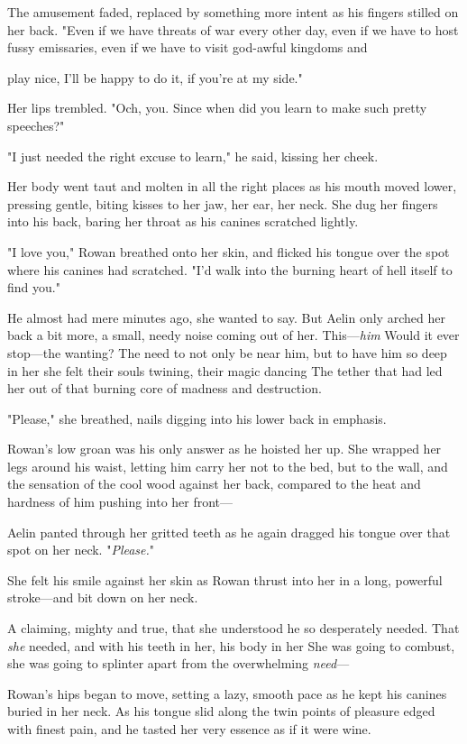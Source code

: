 The amusement faded, replaced by something more intent as his fingers stilled on her back. "Even if we have threats of war every other day, even if we have to host fussy emissaries, even if we have to visit god-awful kingdoms and

play nice, I'll be happy to do it, if you're at my side."

Her lips trembled. "Och, you. Since when did you learn to make such pretty speeches?"

"I just needed the right excuse to learn," he said, kissing her cheek.

Her body went taut and molten in all the right places as his mouth moved lower, pressing gentle, biting kisses to her jaw, her ear, her neck. She dug her fingers into his back, baring her throat as his canines scratched lightly.

"I love you," Rowan breathed onto her skin, and flicked his tongue over the spot where his canines had scratched. "I'd walk into the burning heart of hell itself to find you."

He almost had mere minutes ago, she wanted to say. But Aelin only arched her back a bit more, a small, needy noise coming out of her. This---\emph{him}  Would it ever stop---the wanting? The need to not only be near him, but to have him so deep in her she felt their souls twining, their magic dancing  The tether that had led her out of that burning core of madness and destruction.

"Please," she breathed, nails digging into his lower back in emphasis.

Rowan's low groan was his only answer as he hoisted her up. She wrapped her legs around his waist, letting him carry her not to the bed, but to the wall, and the sensation of the cool wood against her back, compared to the heat and hardness of him pushing into her front---

Aelin panted through her gritted teeth as he again dragged his tongue over that spot on her neck. "\emph{Please.}"

She felt his smile against her skin as Rowan thrust into her in a long, powerful stroke---and bit down on her neck.

A claiming, mighty and true, that she understood he so desperately needed. That \emph{she} needed, and with his teeth in her, his body in her  She was going to combust, she was going to splinter apart from the overwhelming \emph{need}---

Rowan's hips began to move, setting a lazy, smooth pace as he kept his canines buried in her neck. As his tongue slid along the twin points of pleasure edged with finest pain, and he tasted her very essence as if it were wine.

